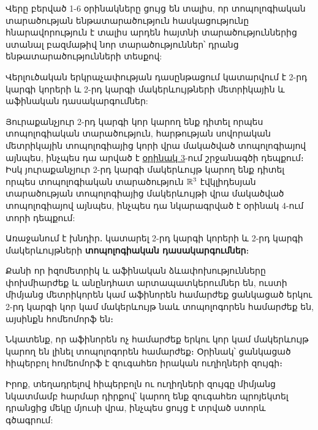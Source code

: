 \documentclass[./main.tex]{subfiles}
\begin{document}
\par Վերը բերված 1-6 օրինակները ցույց են տալիս, որ տոպոլոգիական տարա\-ծու\-թյան ենթատարածություն հասկացությունը հնարավորություն է տալիս արդեն հայտ\-նի տարածություններից ստանալ բազմաթիվ նոր տարածություններ՝ դրանց են\-թա\-տա\-րա\-ծու\-թյունների տեսքով: 

\par Վերլուծական երկրաչափության դասընթացում կատարվում է 2-րդ կարգի կո\-րե\-րի և 2-րդ կարգի մակերևույթների մետրիկային և աֆինական դասակարգումներ:

\par Յուրաքանչյուր 2-րդ կարգի կոր կարող ենք դիտել որպես տոպոլոգիական տա\-րա\-ծու\-թյուն, հարթության սովորական մետրիկային տոպոլոգիայից կորի վրա մա\-կած\-ված տոպոլոգիայով այնպես, ինչպես դա արված է \hyperref[ch11ex3]{օրինակ 3}-ում շրջանագծի դեպ\-քում։ Իսկ յու\-րա\-քանչ\-յուր 2-րդ կարգի մակերևույթ կարող ենք դիտել որպես տոպո\-լո\-գի\-ա\-կան տարածություն $\mathbb{R}^3$ էվկլիդեսյան տարածության տոպոլոգիայից մակ\-երևույթի վրա մակածված տոպոլոգիայով այնպես, ինչպես դա նկարագրված է օրի\-նակ 4-ում տորի դեպքում: 

\par Առաջանում է խնդիր․ կատարել 2-րդ կարգի կորերի և 2-րդ կարգի մակ\-երևույթ\-ների \textbf{տոպոլոգիական դասակարգումներ}։

\par Քանի որ իզոմետրիկ և աֆինական ձևափոխությունները փոխմիարժեք և ան\-ընդ\-հատ արտապատկերումներ են, ուստի միմյանց մետրիկորեն կամ աֆինորեն համարժեք ցանկացած երկու 2-րդ կարգի կոր կամ մակերևույթ նաև տոպոլոգորեն համարժեք են, այսինքն հոմեոմորֆ են։

\par Նկատենք, որ աֆինորեն ոչ համարժեք երկու կոր կամ մակերևույթ կարող են լի\-նել տոպոլոգորեն համարժեք։ Օրինակ՝ ցանկացած հիպերբոլ հոմեոմորֆ է զու\-գա\-հեռ իրական ուղիղների զույգի։

\par Իրոք, տեղադրելով հիպերբոլն ու ուղիղների զույգը միմյանց նկատմամբ հարմար դիրքով՝ կարող ենք զուգահեռ պրոյեկտել դրանցից մեկը մյուսի վրա, ինչպես ցույց է տրված ստորև գծագրում: 
\end{document}

